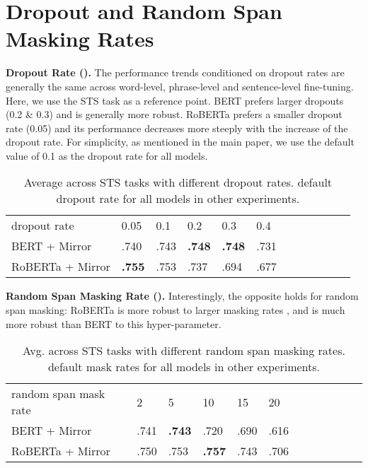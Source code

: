 \documentclass[11pt]{article}
\begin{document}
\section{Dropout and Random Span Masking Rates}

\noindent \textbf{Dropout Rate ().} The performance trends conditioned on dropout rates are generally the same across word-level, phrase-level and sentence-level fine-tuning. Here, we use the STS task as a reference point. BERT prefers larger dropouts (0.2 \& 0.3) and is generally more robust. RoBERTa prefers a smaller dropout rate (0.05) and its performance decreases more steeply with the increase of the dropout rate. For simplicity, as mentioned in the main paper, we use the default value of 0.1 as the dropout rate for all models.


\begin{table}[]
\centering
\setlength{\tabcolsep}{2.0pt}
\small
\begin{tabularx}{\linewidth}{lXXXXXXXXXXX}
\cmidrule[1.0pt]{1-10}
dropout rate &  0.05 & 0.1 & 0.2 & 0.3 & 0.4\\
\cmidrule[1.0pt]{1-10}
BERT + Mirror & .740 & .743 & \textbf{.748} & \textbf{.748} & .731 \\
RoBERTa + Mirror & \textbf{.755} & .753 & .737 & .694 & .677 \\
\bottomrule
\end{tabularx}
\caption{Average  across STS tasks with different dropout rates.  default dropout rate for all models in other experiments.}
\label{tab:dropout_rate}
\end{table}


\vspace{1.3mm}
\noindent \textbf{Random Span Masking Rate ().} Interestingly, the opposite holds for random span masking: RoBERTa is more robust to larger masking rates , and is much more robust than BERT to this hyper-parameter.

\begin{table}[]
\centering
\setlength{\tabcolsep}{2.0pt}
\small
\begin{tabularx}{\linewidth}{lXXXXXXXXXXX}
\cmidrule[1.0pt]{1-10}
random span mask rate  & 2 & 5 & 10 & 15 & 20 \\
\cmidrule[1.0pt]{1-10}
BERT + Mirror & .741 & \textbf{.743} & .720 & .690 & .616 \\
RoBERTa + Mirror & .750 & .753 & \textbf{.757} & .743 & .706  \\
\bottomrule
\end{tabularx}
\caption{Avg.  across STS tasks with different random span masking rates.  default mask rates for all models in other experiments.}
\label{tab:rm_rate}
\end{table}
\end{document}
